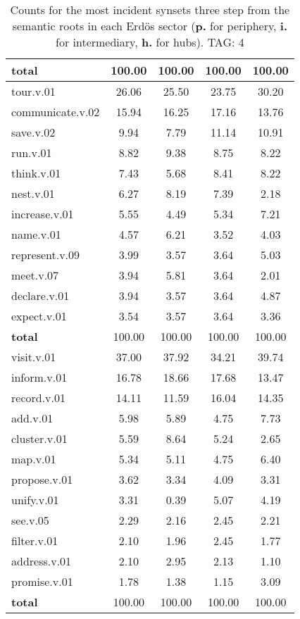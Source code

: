 \begin{table}[h!]
\begin{center}
\begin{tabular}{| l || c | c | c | c |}
{{\bf total}} & 100.00  & 100.00  & 100.00  & 100.00 \\\hline\hline\hline
tour.v.01 & 26.06  & 25.50  & 23.75  & 30.20 \\\hline
communicate.v.02 & 15.94  & 16.25  & 17.16  & 13.76 \\\hline
save.v.02 & 9.94  & 7.79  & 11.14  & 10.91 \\\hline
run.v.01 & 8.82  & 9.38  & 8.75  & 8.22 \\\hline
think.v.01 & 7.43  & 5.68  & 8.41  & 8.22 \\\hline
nest.v.01 & 6.27  & 8.19  & 7.39  & 2.18 \\\hline
increase.v.01 & 5.55  & 4.49  & 5.34  & 7.21 \\\hline
name.v.01 & 4.57  & 6.21  & 3.52  & 4.03 \\\hline
represent.v.09 & 3.99  & 3.57  & 3.64  & 5.03 \\\hline
meet.v.07 & 3.94  & 5.81  & 3.64  & 2.01 \\\hline
declare.v.01 & 3.94  & 3.57  & 3.64  & 4.87 \\\hline
expect.v.01 & 3.54  & 3.57  & 3.64  & 3.36 \\\hline\hline
{{\bf total}} & 100.00  & 100.00  & 100.00  & 100.00 \\\hline\hline\hline
visit.v.01 & 37.00  & 37.92  & 34.21  & 39.74 \\\hline
inform.v.01 & 16.78  & 18.66  & 17.68  & 13.47 \\\hline
record.v.01 & 14.11  & 11.59  & 16.04  & 14.35 \\\hline
add.v.01 & 5.98  & 5.89  & 4.75  & 7.73 \\\hline
cluster.v.01 & 5.59  & 8.64  & 5.24  & 2.65 \\\hline
map.v.01 & 5.34  & 5.11  & 4.75  & 6.40 \\\hline
propose.v.01 & 3.62  & 3.34  & 4.09  & 3.31 \\\hline
unify.v.01 & 3.31  & 0.39  & 5.07  & 4.19 \\\hline
see.v.05 & 2.29  & 2.16  & 2.45  & 2.21 \\\hline
filter.v.01 & 2.10  & 1.96  & 2.45  & 1.77 \\\hline
address.v.01 & 2.10  & 2.95  & 2.13  & 1.10 \\\hline
promise.v.01 & 1.78  & 1.38  & 1.15  & 3.09 \\\hline\hline
{{\bf total}} & 100.00  & 100.00  & 100.00  & 100.00 \\\hline
\end{tabular}
\caption{Counts for the most incident synsets three step from the semantic roots in each Erd\"os sector ({\bf p.} for periphery, {\bf i.} for intermediary, {\bf h.} for hubs). TAG: 4}
\end{center}
\end{table}